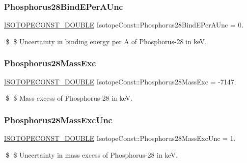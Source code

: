 \subsubsection{\texorpdfstring{Phosphorus28\+Bind\+E\+Per\+A\+Unc}{Phosphorus28BindEPerAUnc}}
{\footnotesize\ttfamily \mbox{\hyperlink{group___isotope_const-_macros_ga8f45a7272ce02c0b4c65c44636ed719a}{I\+S\+O\+T\+O\+P\+E\+C\+O\+N\+S\+T\+\_\+\+D\+O\+U\+B\+LE}} Isotope\+Const\+::\+Phosphorus28\+Bind\+E\+Per\+A\+Unc = 0.}

\$ \$ Uncertainty in binding energy per A of Phosphorus-\/28 in keV. \mbox{\label{group___isotope_const-_phosphorus-_p28_ga659368b896ed8a3d4aad3cd4865196ca}} 
\subsubsection{\texorpdfstring{Phosphorus28\+Mass\+Exc}{Phosphorus28MassExc}}
{\footnotesize\ttfamily \mbox{\hyperlink{group___isotope_const-_macros_ga8f45a7272ce02c0b4c65c44636ed719a}{I\+S\+O\+T\+O\+P\+E\+C\+O\+N\+S\+T\+\_\+\+D\+O\+U\+B\+LE}} Isotope\+Const\+::\+Phosphorus28\+Mass\+Exc = -\/7147.}

\$ \$ Mass excess of Phosphorus-\/28 in keV. \mbox{\label{group___isotope_const-_phosphorus-_p28_ga037451e7735e0ce9eb025ef0e9d6d925}} 
\subsubsection{\texorpdfstring{Phosphorus28\+Mass\+Exc\+Unc}{Phosphorus28MassExcUnc}}
{\footnotesize\ttfamily \mbox{\hyperlink{group___isotope_const-_macros_ga8f45a7272ce02c0b4c65c44636ed719a}{I\+S\+O\+T\+O\+P\+E\+C\+O\+N\+S\+T\+\_\+\+D\+O\+U\+B\+LE}} Isotope\+Const\+::\+Phosphorus28\+Mass\+Exc\+Unc = 1.}

\$ \$ Uncertainty in mass excess of Phosphorus-\/28 in keV. \mbox{\label{group___isotope_const-_phosphorus-_p28_ga6e04811c49f91917df0ef5a3c98a6b3a}} 
